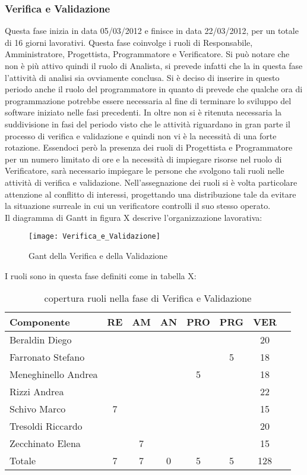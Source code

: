 \subsubsection{Verifica e Validazione}
Questa fase inizia in data 05/03/2012 e finisce in data 22/03/2012, per un totale di 16 giorni lavorativi.
Questa fase coinvolge i ruoli di Responsabile, Amministratore, Progettista, Programmatore e Verificatore. Si può notare che non è più attivo quindi il ruolo di Analista, si prevede infatti che la in questa fase l’attività di analisi sia ovviamente conclusa.
Si è deciso di inserire  in questo periodo anche il ruolo del programmatore in quanto di prevede che qualche ora di programmazione potrebbe essere necessaria al fine di terminare lo sviluppo del software iniziato nelle fasi precedenti.
In oltre non si è ritenuta necessaria la suddivisione in fasi del periodo visto che le attività riguardano in gran parte il processo di verifica e validazione e quindi non vi è la necessità di una forte rotazione.
Essendoci però la presenza dei ruoli di Progettista e Programmatore per un numero limitato di ore e la necessità di impiegare risorse nel ruolo di Verificatore, sarà necessario impiegare le persone che svolgono tali ruoli nelle attività di verifica e validazione.  
Nell’assegnazione dei ruoli si è volta particolare attenzione al conflitto di interessi,  progettando una distribuzione tale da evitare la situazione surreale in cui un verificatore controlli il suo stesso operato.\\
Il diagramma di Gantt in figura X descrive l'organizzazione lavorativa:\\
\begin{figure}[h]
  \texttt{[image: Verifica\_e\_Validazione]}
\caption{Gant della Verifica e della Validazione}
\end{figure}
I ruoli sono in questa fase definiti come in tabella X:\\
\begin{table}[h]
\centering
\begin{tabular}{|l|c|c|c|c|c|cl|}
\hline
Componente& RE& AM& AN& PRO& PRG& VER& \\
\hline
Beraldin Diego & & & & & & 20&\\
Farronato Stefano & & & & & 5& 18&\\
Meneghinello Andrea & & & & 5& & 18&\\
Rizzi Andrea & & & & & & 22&\\
Schivo Marco & 7& & & & & 15&\\
Tresoldi Riccardo & & & & & & 20&\\
Zecchinato Elena & & 7& & & & 15&\\
\hline
Totale & 7& 7& 0& 5& 5& 128&\\
\hline
\end{tabular}
\caption{copertura ruoli nella fase di Verifica e Validazione}
\end{table}
